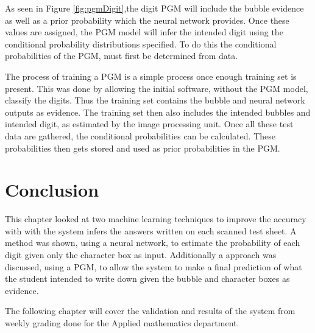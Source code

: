 As seen in Figure \ref{fig:pgmDigit},the digit PGM will include the bubble evidence as well as a prior probability which the neural network provides. Once these values are assigned, the PGM model will infer the intended digit using the conditional probability distributions specified. To do this the conditional probabilities of the PGM, must first be determined from data.



The process of training a PGM is a simple process once enough training set is present. This was done by allowing the initial software, without the PGM model, classify the digits. Thus the training set contains the bubble and neural network outputs as evidence. The training set then also includes the intended bubbles and intended digit, as estimated by the image processing unit. Once all these test data are gathered, the conditional probabilities can be calculated. These probabilities then gets stored and used as prior probabilities in the PGM.

\section{Conclusion}

This chapter looked at two machine learning techniques to improve the accuracy with with the system infers the answers written on each scanned test sheet. A method was shown, using a neural network, to estimate the probability of each digit given only the character box as input. Additionally a approach was discussed, using a PGM, to allow the system to make a final prediction of what the student intended to write down given the bubble and character boxes as evidence.

The following chapter will cover the validation and results of the system from weekly grading done for the Applied mathematics department.